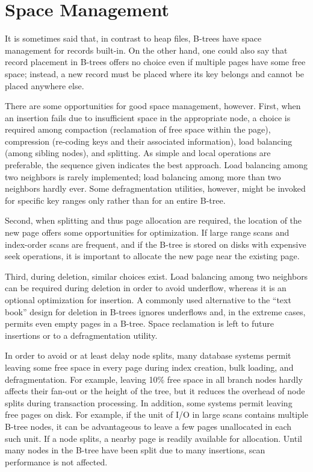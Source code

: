 \hypertarget{space-management}{%
\section{Space Management}\label{space-management}}

It is sometimes said that, in contrast to heap files, B-trees have space
management for records built-in. On the other hand, one could also say
that record placement in B-trees offers no choice even if multiple pages
have some free space; instead, a new record must be placed where its key
belongs and cannot be placed anywhere else.

There are some opportunities for good space management, however. First,
when an insertion fails due to insufficient space in the appropriate
node, a choice is required among compaction (reclamation of free space
within the page), compression (re-coding keys and their associated
information), load balancing (among sibling nodes), and splitting. As
simple and local operations are preferable, the sequence given indicates
the best approach. Load balancing among two neighbors is rarely
implemented; load balancing among more than two neighbors hardly ever.
Some defragmentation utilities, however, might be invoked for specific
key ranges only rather than for an entire B-tree.

Second, when splitting and thus page allocation are required, the
location of the new page offers some opportunities for optimization. If
large range scans and index-order scans are frequent, and if the B-tree
is stored on disks with expensive seek operations, it is important to
allocate the new page near the existing page.

Third, during deletion, similar choices exist. Load balancing among two
neighbors can be required during deletion in order to avoid underflow,
whereas it is an optional optimization for insertion. A commonly used
alternative to the ``text book'' design for deletion in B-trees ignores
underflows and, in the extreme cases, permits even empty pages in a
B-tree. Space reclamation is left to future insertions or to a
defragmentation utility.

In order to avoid or at least delay node splits, many database systems
permit leaving some free space in every page during index creation, bulk
loading, and defragmentation. For example, leaving 10\% free space in
all branch nodes hardly affects their fan-out or the height of the tree,
but it reduces the overhead of node splits during transaction
processing. In addition, some systems permit leaving free pages on disk.
For example, if the unit of I/O in large scans contains multiple B-tree
nodes, it can be advantageous to leave a few pages unallocated in each
such unit. If a node splits, a nearby page is readily available for
allocation. Until many nodes in the B-tree have been split due to many
insertions, scan performance is not affected.

